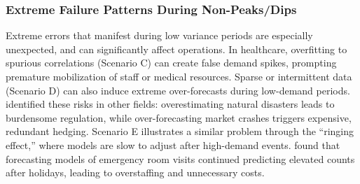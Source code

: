 \documentclass[12pt]{article}
\begin{document}


\subsubsection{Extreme Failure Patterns During Non-Peaks/Dips}
Extreme errors that manifest during low variance periods are especially unexpected, and can significantly affect operations. In healthcare, overfitting to spurious correlations (Scenario C) can create false demand spikes, prompting premature mobilization of staff or medical resources. Sparse or intermittent data (Scenario D) can also induce extreme over-forecasts during low-demand periods. %
\citet{nikolopoulos2021} identified these risks in other fields: overestimating natural disasters leads to burdensome regulation, while over-forecasting market crashes triggers expensive, redundant hedging. Scenario E illustrates a similar problem through the “ringing effect,” where models %
are slow to adjust after high-demand events. \citet{Burkom2007} found that forecasting models of emergency room visits continued predicting elevated counts after holidays, leading to overstaffing and unnecessary costs.
\end{document}
